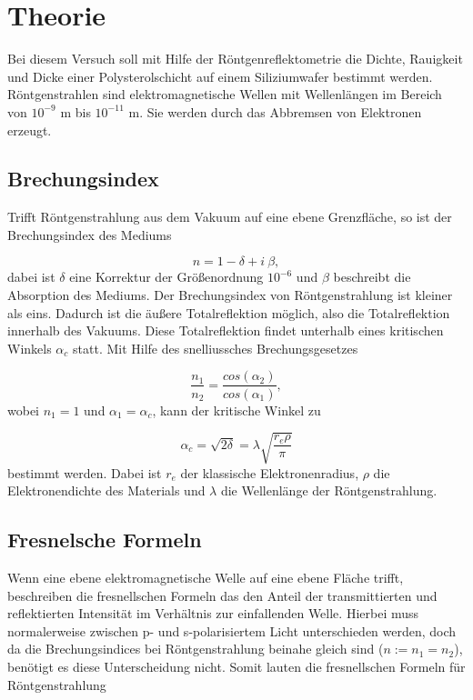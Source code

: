 \section{Theorie}
\label{sec:Theorie}
Bei diesem Versuch soll mit Hilfe der Röntgenreflektometrie die Dichte, Rauigkeit und Dicke einer Polysterolschicht 
auf einem Siliziumwafer bestimmt werden. 
Röntgenstrahlen sind elektromagnetische Wellen mit Wellenlängen im Bereich von $10^{-9}$ m bis $10^{-11}$ m.
Sie werden durch das Abbremsen von Elektronen erzeugt.

\subsection{Brechungsindex}
Trifft Röntgenstrahlung aus dem Vakuum auf eine ebene Grenzfläche, so ist der Brechungsindex des Mediums 

\begin{equation}
    n = 1- \delta + i \: \beta,
\end{equation}
dabei ist $\delta$ eine Korrektur der Größenordnung $10^{-6}$ und $\beta$ beschreibt die Absorption des Mediums.
Der Brechungsindex von Röntgenstrahlung ist kleiner als eins. Dadurch ist die äußere Totalreflektion möglich, also 
die Totalreflektion innerhalb des Vakuums.
Diese Totalreflektion findet unterhalb eines kritischen Winkels $\alpha_c$ statt.
Mit Hilfe des snelliussches Brechungsgesetzes 

\begin{equation}
    \frac{n_1}{n_2} = \frac{cos(\alpha_2)}{cos(\alpha_1)},
\end{equation}
wobei $n_1 = 1$ und $\alpha_1 = \alpha_c$,
kann der kritische Winkel zu 

\begin{equation}
    \alpha_c = \sqrt{2 \delta} = \lambda \sqrt{\frac{r_e \rho}{\pi}}
\end{equation}
bestimmt werden.
Dabei ist $r_e$ der klassische Elektronenradius, $\rho$ die Elektronendichte des Materials und $\lambda$ die Wellenlänge der Röntgenstrahlung.



\subsection{Fresnelsche Formeln}
Wenn eine ebene elektromagnetische Welle auf eine ebene Fläche trifft, beschreiben die fresnellschen Formeln das den Anteil der transmittierten und reflektierten Intensität 
im Verhältnis zur einfallenden Welle. Hierbei muss normalerweise zwischen p- und s-polarisiertem Licht unterschieden werden, doch da die Brechungsindices 
bei Röntgenstrahlung beinahe gleich sind ($n:= n_1 = n_2$), benötigt es diese Unterscheidung nicht.
Somit lauten die fresnellschen Formeln für Röntgenstrahlung

